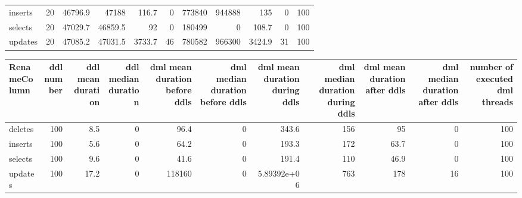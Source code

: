 \begin{tabular}{lrrrrrrrrrr}
 inserts        &           20 &             46796.9 &               47188   &                           116.7 &                                 0 &                          773840 &                            944888 &                          135   &                                0 &                              100 \\
 selects        &           20 &             47029.7 &               46859.5 &                            92   &                                 0 &                          180499 &                                 0 &                          108.7 &                                0 &                              100 \\
 updates        &           20 &             47085.2 &               47031.5 &                          3733.7 &                                46 &                          780582 &                            966300 &                         3424.9 &                               31 &                              100 \\
\hline
\end{tabular}\begin{tabular}{lrrrrrrrrrr}
\hline
 RenameColumn   &   ddl number &   ddl mean duration &   ddl median duration &   dml mean duration before ddls &   dml median duration before ddls &   dml mean duration during ddls &   dml median duration during ddls &   dml mean duration after ddls &   dml median duration after ddls &   number of executed dml threads \\
\hline
 deletes        &          100 &                 8.5 &                     0 &                            96.4 &                                 0 &                   343.6         &                               156 &                           95   &                                0 &                              100 \\
 inserts        &          100 &                 5.6 &                     0 &                            64.2 &                                 0 &                   193.3         &                               172 &                           63.7 &                                0 &                              100 \\
 selects        &          100 &                 9.6 &                     0 &                            41.6 &                                 0 &                   191.4         &                               110 &                           46.9 &                                0 &                              100 \\
 updates        &          100 &                17.2 &                     0 &                        118160   &                                 0 &                     5.89392e+06 &                               763 &                          178   &                               16 &                              100 \\
\hline
\end{tabular}
